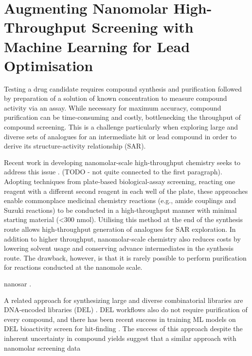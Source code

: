 \chapter{Augmenting Nanomolar High-Throughput Screening with Machine Learning for Lead Optimisation} \label{ch:testing}

Testing a drug candidate requires compound synthesis and purification followed by preparation of a solution of known concentration to measure compound activity via an assay. While necessary for maximum accuracy, compound purification can be time-consuming and costly, bottlenecking the throughput of compound screening. This is a challenge particularly when exploring large and diverse sets of analogues for an intermediate hit or lead compound in order to derive its structure-activity relationship (SAR).

Recent work in developing nanomolar-scale high-throughput chemistry seeks to address this issue \cite{Santarilla2015MerckNanomolar, Perera2018PfizerNanomolar, Gehrtz2022nanomolar}. (TODO - not quite connected to the first paragraph). Adopting techniques from plate-based biological-assay screening, reacting one reagent with a different second reagent in each well of the plate, these approaches enable commonplace medicinal chemistry reactions (e.g., amide couplings and Suzuki reactions) to be conducted in a high-throughput manner with minimal starting material (<300 nmol). Utilising this method at the end of the synthesis route allows high-throughput generation of analogues for SAR exploration. In addition to higher throughput, nanomolar-scale chemistry also reduces costs by lowering solvent usage and conserving advance intermediates in the synthesis route. The drawback, however, is that it is rarely possible to perform purification for reactions conducted at the nanomole scale. 

nanosar \cite{Gesmundo2018nanosar}.

A related approach for synthesizing large and diverse combinatorial libraries are DNA-encoded libraries (DEL) \cite{GirondaMartinez2021DNALibrary}. DEL workflows also do not require purification of every compound, and there has been recent success in training ML models on DEL bioactivity screen for hit-finding \cite{McCloskey2020DNALibrary}. The success of this approach despite the inherent uncertainty in compound yields suggest that a similar approach with nanomolar screening data 


